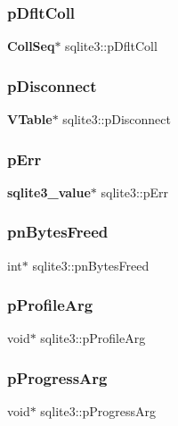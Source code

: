 \mbox{\label{structsqlite3_a2e5d7e7ac07c33b11c936b181d07789a}} 
\subsubsection{pDfltColl}
{\footnotesize\ttfamily \textbf{ Coll\+Seq}$\ast$ sqlite3\+::p\+Dflt\+Coll}

\mbox{\label{structsqlite3_a048405f503316fad7d7116fd930299db}} 
\subsubsection{pDisconnect}
{\footnotesize\ttfamily \textbf{ V\+Table}$\ast$ sqlite3\+::p\+Disconnect}

\mbox{\label{structsqlite3_a90941a0c05641f623c257a7a65b22809}} 
\subsubsection{pErr}
{\footnotesize\ttfamily \textbf{ sqlite3\+\_\+value}$\ast$ sqlite3\+::p\+Err}

\mbox{\label{structsqlite3_a5559fb199b06ee59b635bb18f153fcf8}} 
\subsubsection{pnBytesFreed}
{\footnotesize\ttfamily int$\ast$ sqlite3\+::pn\+Bytes\+Freed}

\mbox{\label{structsqlite3_a931c234df9b701c78de38ddf22869062}} 
\subsubsection{pProfileArg}
{\footnotesize\ttfamily void$\ast$ sqlite3\+::p\+Profile\+Arg}

\mbox{\label{structsqlite3_a1731a4d0a73f57415d35ef2a2997971b}} 
\subsubsection{pProgressArg}
{\footnotesize\ttfamily void$\ast$ sqlite3\+::p\+Progress\+Arg}

